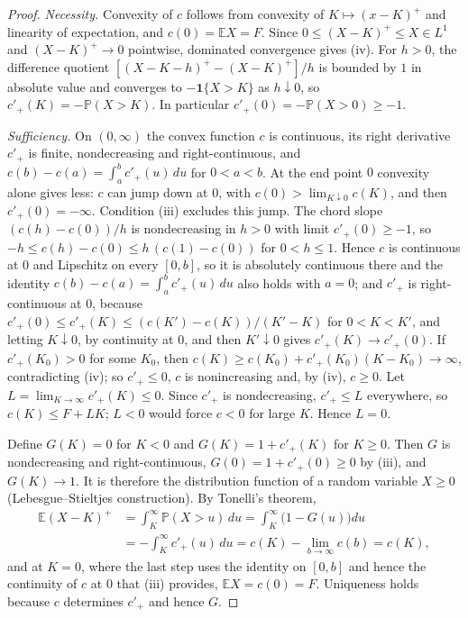 \documentclass[11pt]{article}
\theoremstyle{remark}
\newcommand{\E}{\mathbb{E}}
\renewcommand{\P}{\mathbb{P}}
\begin{document}
\begin{proof}
\emph{Necessity.} Convexity of $c$ follows from convexity of $K\mapsto(x-K)^+$ and linearity of expectation, and $c(0)=\E X=F$. Since $0\le(X-K)^+\le X\in L^1$ and $(X-K)^+\to0$ pointwise, dominated convergence gives (iv). For $h>0$, the difference quotient $[(X-K-h)^+-(X-K)^+]/h$ is bounded by $1$ in absolute value and converges to $-\mathbf 1\{X>K\}$ as $h\downarrow0$, so $c'_+(K)=-\P(X>K)$. In particular $c'_+(0)=-\P(X>0)\ge-1$.

\emph{Sufficiency.} On $(0,\infty)$ the convex function $c$ is continuous, its right derivative $c'_+$ is finite, nondecreasing and right-continuous, and $c(b)-c(a)=\int_a^b c'_+(u)\,du$ for $0<a<b$. At the end point $0$ convexity alone gives less: $c$ can jump down at $0$, with $c(0)>\lim_{K\downarrow0}c(K)$, and then $c'_+(0)=-\infty$. Condition (iii) excludes this jump. The chord slope $(c(h)-c(0))/h$ is nondecreasing in $h>0$ with limit $c'_+(0)\ge-1$, so $-h\le c(h)-c(0)\le h\,(c(1)-c(0))$ for $0<h\le1$. Hence $c$ is continuous at $0$ and Lipschitz on every $[0,b]$, so it is absolutely continuous there and the identity $c(b)-c(a)=\int_a^bc'_+(u)\,du$ also holds with $a=0$; and $c'_+$ is right-continuous at $0$, because $c'_+(0)\le c'_+(K)\le(c(K')-c(K))/(K'-K)$ for $0<K<K'$, and letting $K\downarrow0$, by continuity at $0$, and then $K'\downarrow0$ gives $c'_+(K)\to c'_+(0)$. If $c'_+(K_0)>0$ for some $K_0$, then $c(K)\ge c(K_0)+c'_+(K_0)(K-K_0)\to\infty$, contradicting (iv); so $c'_+\le0$, $c$ is nonincreasing and, by (iv), $c\ge0$. Let $L=\lim_{K\to\infty}c'_+(K)\le0$. Since $c'_+$ is nondecreasing, $c'_+\le L$ everywhere, so $c(K)\le F+LK$; $L<0$ would force $c<0$ for large $K$. Hence $L=0$.

Define $G(K)=0$ for $K<0$ and $G(K)=1+c'_+(K)$ for $K\ge0$. Then $G$ is nondecreasing and right-continuous, $G(0)=1+c'_+(0)\ge0$ by (iii), and $G(K)\to1$. It is therefore the distribution function of a random variable $X\ge0$ (Lebesgue--Stieltjes construction). By Tonelli's theorem,
\begin{align*}
\E(X-K)^+&=\int_K^\infty \P(X>u)\,du=\int_K^\infty\bigl(1-G(u)\bigr)du\\
&=-\int_K^\infty c'_+(u)\,du=c(K)-\lim_{b\to\infty}c(b)=c(K),
\end{align*}
and at $K=0$, where the last step uses the identity on $[0,b]$ and hence the continuity of $c$ at $0$ that (iii) provides, $\E X=c(0)=F$. Uniqueness holds because $c$ determines $c'_+$ and hence $G$.
\end{proof}
\end{document}
